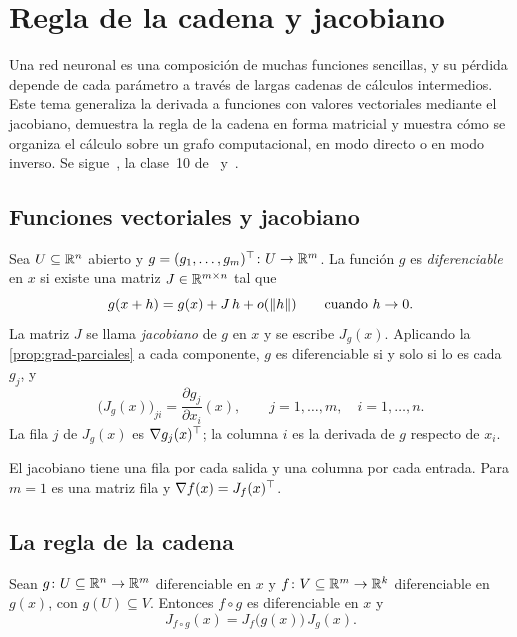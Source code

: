 \chapter{Regla de la cadena y jacobiano}
\label{tema:2}

Una red neuronal es una composición de muchas funciones sencillas, y su pérdida depende de cada parámetro a través de largas cadenas de cálculos intermedios. Este tema generaliza la derivada a funciones con valores vectoriales mediante el jacobiano, demuestra la regla de la cadena en forma matricial y muestra cómo se organiza el cálculo sobre un grafo computacional, en modo directo o en modo inverso. Se sigue~\cite[§5.2, §5.3 y §5.6]{mml}, la clase~10 de~\cite{mit1802} y~\cite[§6.5]{gbc}.

\section{Funciones vectoriales y jacobiano}

\begin{definicion}[Jacobiano]\label{def:jacobiano}
Sea $U\subseteq\mathbb{R}^{n}$ abierto y $g=(g_1,\dots,g_m)^{\top}\colon U\to\mathbb{R}^{m}$. La función $g$ es \emph{diferenciable} en $x$ si existe una matriz $J\in\mathbb{R}^{m\times n}$ tal que
\[
g(x+h)=g(x)+J\,h+o(\lVert h\rVert)\qquad\text{cuando } h\to 0.
\]
La matriz $J$ se llama \emph{jacobiano} de $g$ en $x$ y se escribe $J_g(x)$. Aplicando la \cref{prop:grad-parciales} a cada componente, $g$ es diferenciable si y solo si lo es cada $g_j$, y
\[
\bigl(J_g(x)\bigr)_{ji}=\frac{\partial g_j}{\partial x_i}(x),\qquad j=1,\dots,m,\quad i=1,\dots,n.
\]
La fila $j$ de $J_g(x)$ es $\nabla g_j(x)^{\top}$; la columna $i$ es la derivada de $g$ respecto de $x_i$.
\end{definicion}

El jacobiano tiene una fila por cada salida y una columna por cada entrada. Para $m=1$ es una matriz fila y $\nabla f(x)=J_f(x)^{\top}$.

\addtocounter{definicion}{1}%

\addtocounter{definicion}{1}%

\section{La regla de la cadena}

\begin{teorema}\label{teo:cadena}
Sean $g\colon U\subseteq\mathbb{R}^{n}\to\mathbb{R}^{m}$ diferenciable en $x$ y $f\colon V\subseteq\mathbb{R}^{m}\to\mathbb{R}^{k}$ diferenciable en $g(x)$, con $g(U)\subseteq V$. Entonces $f\circ g$ es diferenciable en $x$ y
\[
J_{f\circ g}(x)=J_f\bigl(g(x)\bigr)\,J_g(x).
\]
\end{teorema}

